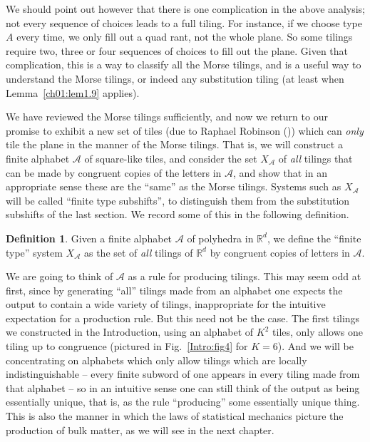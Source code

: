 \documentclass[reqno]{stml-l}
\theoremstyle{plain}
\theoremstyle{definition}
\newtheorem{definition}[theorem]{Definition}
\numberwithin{equation}{chapter}
\begin{document}
We should point out however that there is one complication in the above analysis; not every sequence of choices leads to a full tiling. For instance, if we choose type $A$ every time, we only fill out a quad rant, not the whole plane. So some tilings require two, three or four sequences of choices to fill out the plane. Given that complication, this is a way to classify all the Morse tilings, and is a useful way to understand the Morse tilings, or indeed any substitution tiling (at least when Lemma~\ref{ch01:lem1.9} applies).

We have reviewed the Morse tilings sufficiently, and now we return to our promise to exhibit a new set of tiles (due to Raphael Robinson (\cite{bib:Rob,bib:GrS})) which can \emph{only} tile the plane in the manner of the Morse tilings. That is, we will construct a finite alphabet $\mathcal{A}$ of square-like tiles, and consider the set $X_{\mathcal{A}}$ of \emph{all} tilings that can be made by congruent copies of the letters in $\mathcal{A}$, and show that in an appropriate sense these are the ``same'' as the Morse tilings. Systems such as $X_{\mathcal{A}}$ will be called ``finite type subshifts'', to distinguish them from the substitution subshifts of the last section. We record some of this in the following definition.

\setcounter{theorem}{8}
\begin{definition}\label{ch01:def1.9}
Given a finite alphabet $\mathcal{A}$ of polyhedra in $\mathbb{R}^{d}$, we define the ``finite type'' system $X_{\mathcal{A}}$ as the set of \emph{all} tilings of $\mathbb{R}^{d}$ by congruent copies of letters in $\mathcal{A}$.
\end{definition}

We are going to think of $\mathcal{A}$ as a rule for producing tilings. This may seem odd at first, since by generating ``all'' tilings made from an alphabet one expects the output to contain a wide variety of tilings, inappropriate for the intuitive expectation for a production rule. But this need not be the case. The first tilings we constructed in the Introduction, using an alphabet of $K^{2}$ tiles, only allows one tiling up to congruence (pictured in Fig.~\ref{Intro:fig4} for $K=6$). And we will be concentrating on alphabets which only allow tilings which are locally indistinguishable -- every finite subword of one appears in every tiling made from that alphabet -- so in an intuitive sense one can still think of the output as being essentially unique, that is, as the rule ``producing''
some essentially unique thing. This is also the manner in which the laws of statistical mechanics picture the production of bulk matter, as we will see in the next chapter.
\end{document}
